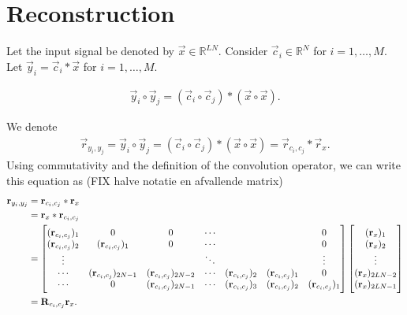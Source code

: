 \documentclass[a4paper, openany, oneside]{memoir}
\begin{document}
\chapter{Reconstruction}
Let the input signal be denoted by $\vec{x} \in \mathbb{R}^{LN}$. Consider $\vec{c}_i \in \mathbb{R}^{N}$ for $i = 1,\ldots,M$. Let $\vec{y}_i = \vec{c}_i \ast \vec{x}$ for $i = 1,\ldots,M$.
\begin{theorem} \label{th:conv-corr}
    \begin{align*}
        \vec{y}_i \circ \vec{y}_j = (\vec{c}_i \circ \vec{c}_j) \ast (\vec{x} \circ \vec{x}).
    \end{align*}
\end{theorem}
We denote 
\begin{align*}
    \vec{r}_{y_i,y_j} = \vec{y}_i \circ \vec{y}_j = (\vec{c}_i \circ \vec{c}_j) \ast (\vec{x} \circ \vec{x}) = \vec{r}_{c_i,c_j} \ast \vec{r}_x.
\end{align*}
Using commutativity and the definition of the convolution operator, we can write this equation as (FIX halve notatie en afvallende matrix)
\begin{align*}
    \boldsymbol{\mathbf{r}}_{y_i,y_j} &=  \boldsymbol{\mathbf{r}}_{c_i,c_j} \ast \boldsymbol{\mathbf{r}}_x \\
    &= \boldsymbol{\mathbf{r}}_x \ast \boldsymbol{\mathbf{r}}_{c_i,c_j} \\
    &= \begin{bmatrix}
        (\boldsymbol{\mathbf{r}}_{c_i,c_j})_1 & 0 & 0& \cdots & & &  0 \\
        (\boldsymbol{\mathbf{r}}_{c_i,c_j})_2 & (\boldsymbol{\mathbf{r}}_{c_i,c_j})_1 & 0 & \cdots & & & 0 \\
        \vdots &  & & \ddots & &  & \vdots\\
        \cdots & (\boldsymbol{\mathbf{r}}_{c_i,c_j})_{2N-1} & (\boldsymbol{\mathbf{r}}_{c_i,c_j})_{2N-2} & \cdots & (\boldsymbol{\mathbf{r}}_{c_i,c_j})_2 & (\boldsymbol{\mathbf{r}}_{c_i,c_j})_1 & 0 \\
        \cdots & 0 & (\boldsymbol{\mathbf{r}}_{c_i,c_j})_{2N-1} & \cdots & (\boldsymbol{\mathbf{r}}_{c_i,c_j})_3 & (\boldsymbol{\mathbf{r}}_{c_i,c_j})_2 & (\boldsymbol{\mathbf{r}}_{c_i,c_j})_1 \\
    \end{bmatrix} \begin{bmatrix}
        (\boldsymbol{\mathbf{r}}_x)_1 \\
        (\boldsymbol{\mathbf{r}}_x)_2 \\
        \vdots \\
        (\boldsymbol{\mathbf{r}}_x)_{2LN-2} \\
        (\boldsymbol{\mathbf{r}}_x)_{2LN-1}
    \end{bmatrix} \\
    &= \boldsymbol{\mathbf{R}}_{c_i,c_j} \boldsymbol{\mathbf{r}}_x.
\end{align*}
\end{document}

